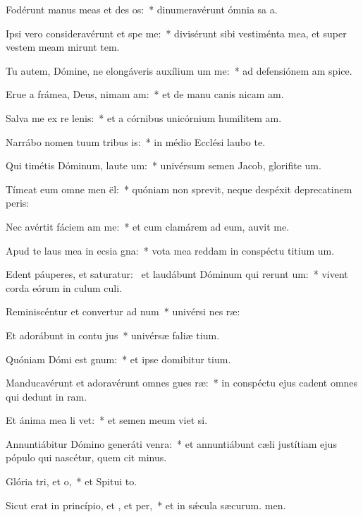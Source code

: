 \item Fodérunt manus meas et des os:~* dinumeravérunt ómnia sa a.
\item Ipsi vero consideravérunt et spe me:~* divisérunt sibi vestiménta mea, et super vestem meam mirunt tem.
\item Tu autem, Dómine, ne elongáveris auxílium um  me:~* ad defensiónem am spice.
\item Erue a frámea, Deus, nimam am:~* et de manu canis nicam am.
\item Salva me ex re lenis:~* et a córnibus unicórnium humilitem am.
\item Narrábo nomen tuum tribus is:~* in médio Ecclési laubo te.
\item Qui timétis Dóminum, laute um:~* univérsum semen Jacob, glorifite um.
\item Tímeat eum omne men ël:~* quóniam non sprevit, neque despéxit deprecatinem peris:
\item Nec avértit fáciem am  me:~* et cum clamárem ad eum, auvit me.
\item Apud te laus mea in ecsia gna:~* vota mea reddam in conspéctu titium um.
\item Edent páuperes, et saturatur:~\pscross{} et laudábunt Dóminum qui rerunt um:~* vivent corda eórum in culum culi.
\item Reminiscéntur et convertur ad num~* univérsi nes ræ:
\item Et adorábunt in contu jus~* univérsæ faliæ tium.
\item Quóniam Dómi est gnum:~* et ipse domibitur tium.
\item Manducavérunt et adoravérunt omnes gues ræ:~* in conspéctu ejus cadent omnes qui dedunt in ram.
\item Et ánima mea li vet:~* et semen meum viet si.
\item Annuntiábitur Dómino generáti venra:~* et annuntiábunt cæli justítiam ejus pópulo qui nascétur, quem cit minus.
\item Glória tri, et o,~* et Spitui to.
\item Sicut erat in princípio, et , et per,~* et in sǽcula sæcurum. men.
